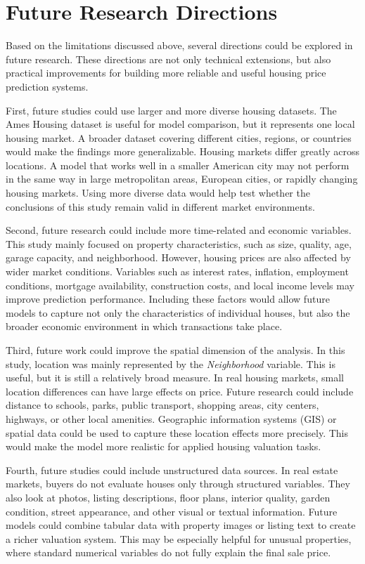 \documentclass[12pt,a4paper,oneside,openany]{book}
\begin{document}
\section{Future Research Directions}

Based on the limitations discussed above, several directions could be explored in future research. These directions are not only technical extensions, but also practical improvements for building more reliable and useful housing price prediction systems.

First, future studies could use larger and more diverse housing datasets. The Ames Housing dataset is useful for model comparison, but it represents one local housing market. A broader dataset covering different cities, regions, or countries would make the findings more generalizable. Housing markets differ greatly across locations. A model that works well in a smaller American city may not perform in the same way in large metropolitan areas, European cities, or rapidly changing housing markets. Using more diverse data would help test whether the conclusions of this study remain valid in different market environments.

Second, future research could include more time-related and economic variables. This study mainly focused on property characteristics, such as size, quality, age, garage capacity, and neighborhood. However, housing prices are also affected by wider market conditions. Variables such as interest rates, inflation, employment conditions, mortgage availability, construction costs, and local income levels may improve prediction performance. Including these factors would allow future models to capture not only the characteristics of individual houses, but also the broader economic environment in which transactions take place.

Third, future work could improve the spatial dimension of the analysis. In this study, location was mainly represented by the \textit{Neighborhood} variable. This is useful, but it is still a relatively broad measure. In real housing markets, small location differences can have large effects on price. Future research could include distance to schools, parks, public transport, shopping areas, city centers, highways, or other local amenities. Geographic information systems (GIS) or spatial data could be used to capture these location effects more precisely. This would make the model more realistic for applied housing valuation tasks.

Fourth, future studies could include unstructured data sources. In real estate markets, buyers do not evaluate houses only through structured variables. They also look at photos, listing descriptions, floor plans, interior quality, garden condition, street appearance, and other visual or textual information. Future models could combine tabular data with property images or listing text to create a richer valuation system. This may be especially helpful for unusual properties, where standard numerical variables do not fully explain the final sale price.
\end{document}

